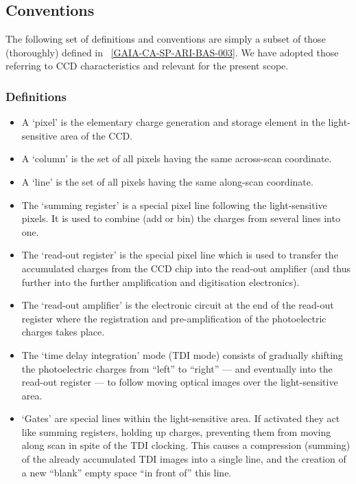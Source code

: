 \documentclass[a4paper, 11pt]{article}
\begin{document}
\newpage

\subsection{Conventions}

The following set of definitions and conventions are simply a subset of those (thoroughly) defined in ~\ref{GAIA-CA-SP-ARI-BAS-003}. We have adopted those referring to CCD characteristics and relevant for the present scope.

\subsubsection{Definitions}

\begin{itemize}
\item A `pixel' is the elementary charge generation and storage element in
the light-sensitive area of the CCD.
\item A `column' is the set of all pixels having the same across-scan
coordinate.
\item A `line' is the set of all pixels having the same along-scan
coordinate.
\item The `summing register' is a special pixel line following
the light-sensitive pixels. It is used to combine (add or bin) the charges from
several lines into one.
\item The `read-out register' is the special pixel line which is used to transfer the accumulated charges from the CCD chip
into the read-out amplifier (and thus further into the further amplification and
digitisation electronics).
\item The `read-out amplifier' is the electronic circuit at the end of the read-out register where the registration and
pre-amplification of the photoelectric charges takes place.
\item The `time delay integration' mode (TDI mode) consists of gradually shifting the photoelectric
charges from ``left'' to ``right''  --- and eventually into the read-out
register --- to follow moving optical images over the light-sensitive area.
\item `Gates' are special lines within
the light-sensitive area. If activated they act like summing registers,
holding up charges, preventing them from moving along scan in spite
of the TDI clocking. This causes a compression (summing) of the already
accumulated TDI images into a single line, and the creation of a new
``blank'' empty space ``in front of'' this line.
\end{itemize}
\end{document}
